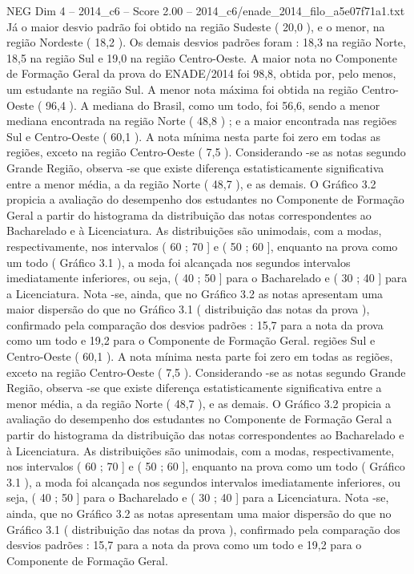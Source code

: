 \begin{textsample}{NEG Dim 4 – 2014\_c6 – Score 2.00 – 2014\_c6/enade\_2014\_filo\_a5e07f71a1.txt}
Já o maior desvio padrão foi obtido na região Sudeste ( 20,0 ), e o menor, na região Nordeste ( 18,2 ).
Os demais desvios padrões foram : 18,3 na região Norte, 18,5 na região Sul e 19,0 na região Centro-Oeste.
A maior nota no Componente de Formação Geral da prova do ENADE/2014 foi 98,8, obtida por, pelo menos, um estudante na região Sul.
A menor nota máxima foi obtida na região Centro-Oeste ( 96,4 ).
A mediana do Brasil, como um todo, foi 56,6, sendo a menor mediana encontrada na região Norte ( 48,8 ) ; e a maior encontrada nas regiões Sul e Centro-Oeste ( 60,1 ).
A nota mínima nesta parte foi zero em todas as regiões, exceto na região Centro-Oeste ( 7,5 ).
Considerando -se as notas segundo Grande Região, observa -se que existe diferença estatisticamente significativa entre a menor média, a da região Norte ( 48,7 ), e as demais.
O Gráfico 3.2 propicia a avaliação do desempenho dos estudantes no Componente de Formação Geral a partir do histograma da distribuição das notas correspondentes ao Bacharelado e à Licenciatura.
As distribuições são unimodais, com a modas, respectivamente, nos intervalos ( 60 ; 70 ] e ( 50 ; 60 ], enquanto na prova como um todo ( Gráfico 3.1 ), a moda foi alcançada nos segundos intervalos imediatamente inferiores, ou seja, ( 40 ; 50 ] para o Bacharelado e ( 30 ; 40 ] para a Licenciatura.
Nota -se, ainda, que no Gráfico 3.2 as notas apresentam uma maior dispersão do que no Gráfico 3.1 ( distribuição das notas da prova ), confirmado pela comparação dos desvios padrões : 15,7 para a nota da prova como um todo e 19,2 para o Componente de Formação Geral. regiões Sul e Centro-Oeste ( 60,1 ).
A nota mínima nesta parte foi zero em todas as regiões, exceto na região Centro-Oeste ( 7,5 ).
Considerando -se as notas segundo Grande Região, observa -se que existe diferença estatisticamente significativa entre a menor média, a da região Norte ( 48,7 ), e as demais.
O Gráfico 3.2 propicia a avaliação do desempenho dos estudantes no Componente de Formação Geral a partir do histograma da distribuição das notas correspondentes ao Bacharelado e à Licenciatura.
As distribuições são unimodais, com a modas, respectivamente, nos intervalos ( 60 ; 70 ] e ( 50 ; 60 ], enquanto na prova como um todo ( Gráfico 3.1 ), a moda foi alcançada nos segundos intervalos imediatamente inferiores, ou seja, ( 40 ; 50 ] para o Bacharelado e ( 30 ; 40 ] para a Licenciatura.
Nota -se, ainda, que no Gráfico 3.2 as notas apresentam uma maior dispersão do que no Gráfico 3.1 ( distribuição das notas da prova ), confirmado pela comparação dos desvios padrões : 15,7 para a nota da prova como um todo e 19,2 para o Componente de Formação Geral.

\end{textsample}
